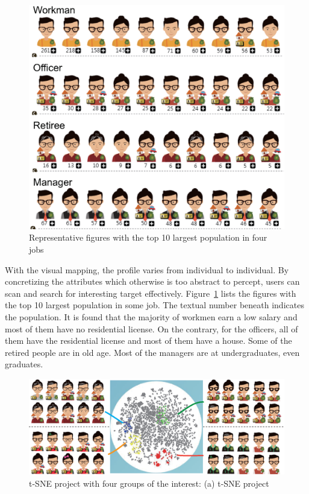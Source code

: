 \begin{figure}[htb!]
 \centering %
 \includegraphics[width=0.6\columnwidth]{pictures/design_example}
 \caption{Representative figures with the top 10 largest population in four jobs}
 \label{fig:div_example}
\end{figure}

With the visual mapping, the profile varies from individual to individual. By concretizing the attributes which otherwise is too abstract to percept, users can scan and search for interesting target effectively. Figure~\ref{fig:div_example} lists the figures with the top 10 largest population in some job. The textual number beneath indicates the population. It is found that the majority of workmen earn a low salary and most of them have no residential license. On the contrary, for the officers, all of them have the residential license and most of them have a house. Some of the retired people are in old age. Most of the managers are at undergraduates, even graduates.


 

\begin{figure}[htb!]
 \centering %
 \includegraphics[width=\columnwidth]{pictures/tsne}
 \caption{t-SNE project with four groups of the interest: (a) t-SNE project }
 \label{fig:tsne}
\end{figure}

